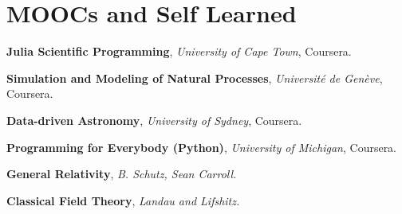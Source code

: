 \section{MOOCs and Self Learned}

\begin{highlights}
    \item \textbf{Julia Scientific Programming},
    \textit{University of Cape Town}, Coursera.
    
    \item \textbf{Simulation and Modeling of Natural Processes},
    \textit{Université de Genève}, Coursera.

    \item \textbf{Data-driven Astronomy},
    \textit{University of Sydney}, Coursera.

    \item \textbf{Programming for Everybody (Python)},
    \textit{University of Michigan}, Coursera.

    \item \textbf{General Relativity}, \textit{B. Schutz, Sean Carroll.} 

    \item \textbf{Classical Field Theory}, \textit{ Landau and Lifshitz.}
    
\end{highlights}




